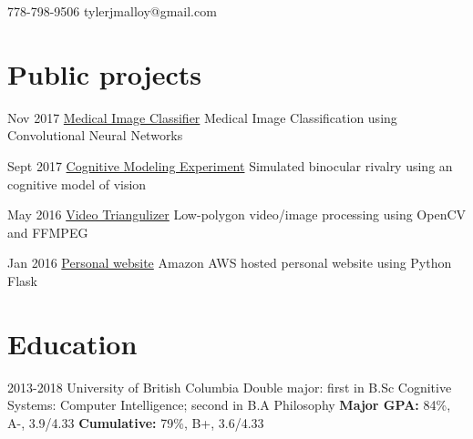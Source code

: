 \documentclass{tccv}
\begin{document}
    \newpage
    
        {778-798-9506}
        {tylerjmalloy@gmail.com}
    
    
    \section{Public projects}
    
    \begin{yearlist}
    
    \item{Nov 2017}
         {\href{https://github.com/TylerJamesMalloy/MedicalImageClassifier}{Medical Image Classifier}}
         {Medical Image Classification using Convolutional Neural Networks}
    
    \item{Sept 2017}
         {\href{https://github.com/TylerJamesMalloy/CogsResearchProposal}{Cognitive Modeling Experiment}}
         {Simulated binocular rivalry using an cognitive model of vision}
        
    \item{May 2016}
         {\href{https://github.com/jinichu/Triangulizer}{Video Triangulizer}}
         {Low-polygon video/image processing using OpenCV and FFMPEG}
         
    \item{Jan 2016}
         {\href{https://github.com/TylerJamesMalloy/PersonalWebsite}{Personal website}}
         {Amazon AWS hosted personal website using Python Flask}
    
    
    \end{yearlist}
    
    \section{Education}
    
    \begin{yearlist}
    
    \item{2013-2018}
         {University of British Columbia}
         {Double major: first in B.Sc Cognitive Systems: Computer Intelligence; second in B.A Philosophy 
         \textbf{Major GPA:} 84\%, A-, 3.9/4.33 \qquad 
         \textbf{Cumulative:} 79\%, B+, 3.6/4.33  }
    
    \iffalse
    \item{Major GPA}
         {(84\%, A-, 3.9/4.33 GPA)}
         {}
    \fi
         
    \end{yearlist}
    
\end{document}
